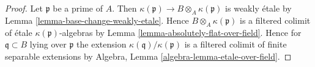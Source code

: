 \documentclass[10pt,a4paper]{amsart}
\theoremstyle{plain}
\theoremstyle{definition}
\theoremstyle{remark}
\numberwithin{equation}{subsection}
\begin{document}
\begin{proof}
Let $\mathfrak p$ be a prime of $A$. Then
$\kappa(\mathfrak p) \to B \otimes_A \kappa(\mathfrak p)$ is weakly \'etale by
Lemma \ref{lemma-base-change-weakly-etale}.
Hence $B \otimes_A \kappa(\mathfrak p)$ is a filtered colimit of
\'etale $\kappa(\mathfrak p)$-algebras by
Lemma \ref{lemma-absolutely-flat-over-field}.
Hence for $\mathfrak q \subset B$ lying over $\mathfrak p$ the
extension $\kappa(\mathfrak q)/\kappa(\mathfrak p)$ is
a filtered colimit of finite separable extensions by
Algebra, Lemma \ref{algebra-lemma-etale-over-field}.
\end{proof}
\end{document}
